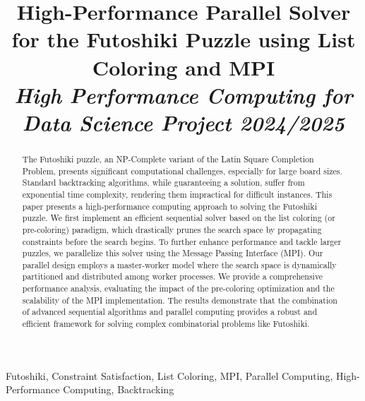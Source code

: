 \documentclass[10pt, conference]{IEEEtran}
\begin{document}
\title{High-Performance Parallel Solver for the Futoshiki Puzzle using List Coloring and MPI\\
\normalsize \textit{High Performance Computing for Data Science Project 2024/2025}
}


\author{
\and
{}
}

\maketitle

\begin{abstract}
The Futoshiki puzzle, an NP-Complete variant of the Latin Square Completion Problem, presents significant computational challenges, especially for large board sizes. Standard backtracking algorithms, while guaranteeing a solution, suffer from exponential time complexity, rendering them impractical for difficult instances. This paper presents a high-performance computing approach to solving the Futoshiki puzzle. We first implement an efficient sequential solver based on the list coloring (or pre-coloring) paradigm, which drastically prunes the search space by propagating constraints before the search begins. To further enhance performance and tackle larger puzzles, we parallelize this solver using the Message Passing Interface (MPI). Our parallel design employs a master-worker model where the search space is dynamically partitioned and distributed among worker processes. We provide a comprehensive performance analysis, evaluating the impact of the pre-coloring optimization and the scalability of the MPI implementation. The results demonstrate that the combination of advanced sequential algorithms and parallel computing provides a robust and efficient framework for solving complex combinatorial problems like Futoshiki.
\end{abstract}

\begin{IEEEkeywords}
Futoshiki, Constraint Satisfaction, List Coloring, MPI, Parallel Computing, High-Performance Computing, Backtracking
\end{IEEEkeywords}











\end{document}

